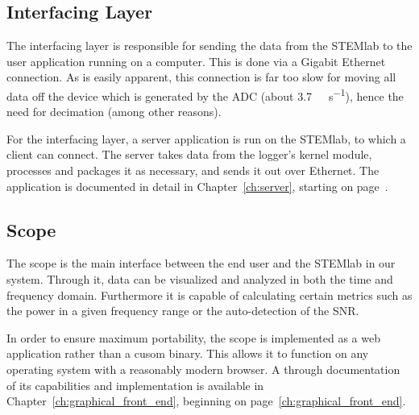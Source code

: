 \subsection{Interfacing Layer} %
\label{subsec:concept:interfacing_layer}

The interfacing layer is responsible for  sending the data from the STEMlab to
the  user application  running  on  a computer. This  is  done  via a  Gigabit
Ethernet connection. As  is easily apparent,  this connection is far  too slow
for  moving all  data off  the device  which is  generated by  the ADC  (about
\SI{3.7}{\gibi\byte\per\second}), hence  the need for decimation  (among other
reasons).

For the  interfacing layer,  a server  application is run  on the  STEMlab, to
which a  client can connect. The  server takes  data from the  logger's kernel
module,  processes  and packages  it  as  necessary,  and  sends it  out  over
Ethernet.  The application is documented in detail in Chapter~\ref{ch:server},
starting on page~\pageref{ch:server}.

%
%
\subsection{Scope} %
\label{subsec:concept:scope}

The scope is  the main interface between  the end user and the  STEMlab in our
system. Through it, data  can be visualized and analyzed in  both the time and
frequency domain.   Furthermore it is  capable of calculating  certain metrics
such as the power in a given frequency range or the auto-detection of the SNR.

In  order  to  ensure  maximum   portability,  the  scope  is  implemented  as
a   web   application   rather   than   a   cusom   binary. This   allows   it
to   function   on   any   operating   system   with   a   reasonably   modern
browser. A  through  documentation  of  its  capabilities  and  implementation
is   available    in   Chapter~\ref{ch:graphical_front_end},    beginning   on
page~\ref{ch:graphical_front_end}.

